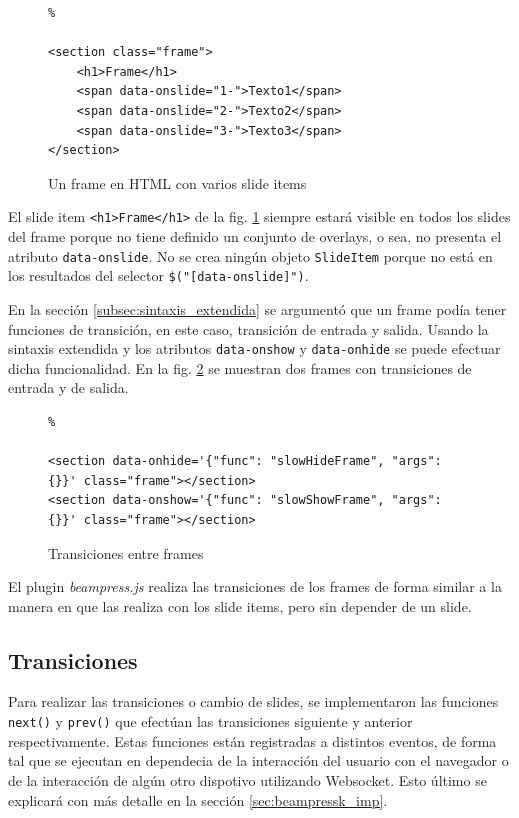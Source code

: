 			\begin{figure}[htb]%
				\begin{lstlisting}%

<section class="frame">
	<h1>Frame</h1>
	<span data-onslide="1-">Texto1</span>
	<span data-onslide="2-">Texto2</span>
	<span data-onslide="3-">Texto3</span>
</section>
				\end{lstlisting}
				\caption{Un frame en HTML con varios slide items}
				\label{fig:frame_html_slides}
			\end{figure}

			El slide item \texttt{<h1>Frame</h1>} de la fig. \ref{fig:frame_html_slides} siempre estará visible en todos los slides del frame porque no tiene definido un conjunto de overlays, o sea, no presenta el atributo \texttt{data-onslide}. No se crea ningún objeto \texttt{SlideItem} porque no está en los resultados del selector \texttt{\$("[data-onslide]")}.


			En la sección \ref{subsec:sintaxis_extendida} se argumentó que un frame podía tener funciones de transición, en este caso, transición de entrada y salida. Usando la sintaxis extendida y los atributos \texttt{data-onshow} y \texttt{data-onhide} se puede efectuar dicha funcionalidad. En la fig. \ref{fig:frames_transitions} se muestran dos frames con transiciones de entrada y de salida.


		\begin{figure}[htb]%
			\begin{lstlisting}%

<section data-onhide='{"func": "slowHideFrame", "args": {}}' class="frame"></section>
<section data-onshow='{"func": "slowShowFrame", "args": {}}' class="frame"></section>
			\end{lstlisting}
		\caption{Transiciones entre frames}
		\label{fig:frames_transitions}
		\end{figure}	

		El plugin \textit{beampress.js} realiza las transiciones de los frames de forma similar a la manera en que las realiza con los slide items, pero sin depender de un slide.

		\subsection{Transiciones} %
		\label{sub:transiciones}
			Para realizar las transiciones o cambio de slides, se implementaron las funciones \texttt{next()} y \texttt{prev()} que efectúan las transiciones siguiente y anterior respectivamente. Estas funciones están registradas a distintos eventos, de forma tal que se ejecutan en dependecia de la interacción del usuario con el navegador o de la interacción de algún otro dispotivo utilizando Websocket. Esto último se explicará con más detalle en la sección \ref{sec:beampressk_imp}.

